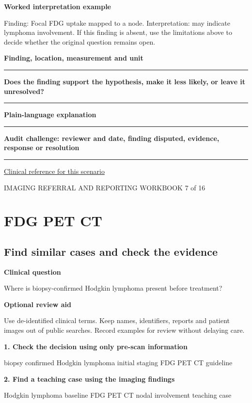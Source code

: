 \documentclass[11pt,a4paper]{article}
\newcommand{\record}[1]{\textbf{#1}\par\vspace{0.55\baselineskip}\hrule\vspace{0.35\baselineskip}}
\begin{document}
\textbf{Worked interpretation example}\par Finding: Focal FDG uptake mapped to a node. Interpretation: may indicate lymphoma involvement. If this finding is absent, use the limitations above to decide whether the original question remains open.\par

\record{Finding, location, measurement and unit}

\record{Does the finding support the hypothesis, make it less likely, or leave it unresolved?}

\record{Plain-language explanation}

\record{Audit challenge: reviewer and date, finding disputed, evidence, response or resolution}

\small\href{https://pmc.ncbi.nlm.nih.gov/articles/12165998/}{Clinical reference for this scenario}

\normalsize

\newpage

{\small IMAGING REFERRAL AND REPORTING WORKBOOK \hfill 7 of 16}

\section*{FDG PET CT}

\subsection*{Find similar cases and check the evidence}

\textbf{Clinical question}\par Where is biopsy-confirmed Hodgkin lymphoma present before treatment?\par

\textbf{Optional review aid}\par Use de-identified clinical terms. Keep names, identifiers, reports and patient images out of public searches. Record examples for review without delaying care.\par

\textbf{1. Check the decision using only pre-scan information}\par biopsy confirmed Hodgkin lymphoma initial staging FDG PET CT guideline\par

\textbf{2. Find a teaching case using the imaging findings}\par Hodgkin lymphoma baseline FDG PET CT nodal involvement teaching case\par
\end{document}
